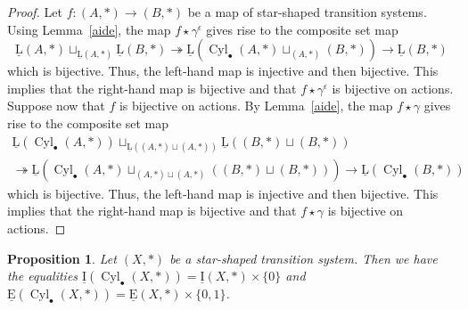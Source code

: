 \documentclass[a4paper,12pt]{amsart}
\newtheorem{prop}[thm]{Proposition}
\begin{document}
\begin{proof} Let $f:(A,*) \to (B,*)$ be a map of star-shaped transition
systems.  Using Lemma~\ref{aide}, the map $f\star \gamma^\epsilon$
gives rise to the composite set map
\[\operatorname{\underline{L}}(A,*) \sqcup_{\operatorname{\underline{L}}(A,*)} \operatorname{\underline{L}}(B,*) \twoheadrightarrow \operatorname{\underline{L}}\left(\operatorname{{Cyl}}_\bullet(A,*) \sqcup_{(A,*)} (B,*)\right)
\longrightarrow \operatorname{\underline{L}}(B,*)\] which is bijective. Thus, the left-hand map
is injective and then bijective. This implies that the right-hand map
is bijective and that $f\star \gamma^\epsilon$ is bijective on
actions.  Suppose now that $f$ is bijective on actions. By
Lemma~\ref{aide}, the map $f\star \gamma$ gives rise to the composite
set map
\begin{multline*}\operatorname{\underline{L}}(\operatorname{{Cyl}}_\bullet(A,*)) \sqcup_{\operatorname{\underline{L}}((A,*)\sqcup
    (A,*))} \operatorname{\underline{L}}((B,*)\sqcup (B,*))\\\twoheadrightarrow
  \operatorname{\underline{L}}\left(\operatorname{{Cyl}}_\bullet(A,*) \sqcup_{(A,*)\sqcup (A,*)} ((B,*)\sqcup
    (B,*))\right) \longrightarrow
  \operatorname{\underline{L}}(\operatorname{{Cyl}}_\bullet(B,*))\end{multline*} which is bijective. Thus, the
left-hand map is injective and then bijective. This implies that the
right-hand map is bijective and that $f\star \gamma$ is bijective on
actions.  \end{proof}

\begin{prop} \label{int-ext-cyl} Let $(X,*)$ be a star-shaped transition
system. Then we have the equalities
$\operatorname{\underline{I}}(\operatorname{{Cyl}}_\bullet(X,*))=\operatorname{\underline{I}}(X,*)\times \{0\}$ and
$\operatorname{\underline{E}}(\operatorname{{Cyl}}_\bullet(X,*))=\operatorname{\underline{E}}(X,*)\times \{0,1\}$. \end{prop}
\end{document}
